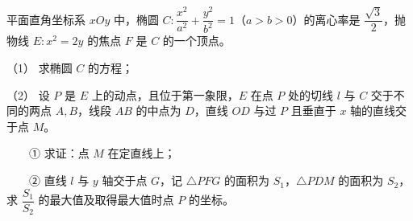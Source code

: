 \begin{question}
平面直角坐标系 \(xOy\) 中，椭圆 \(C:\dfrac{x^{2}}{a^{2}}+\dfrac{y^{2}}{b^{2}}=1\)（\(a>b>0\)）的离心率是 \(\dfrac{\sqrt{3}}{2}\)，抛物线 \(E:x^{2}=2y\) 的焦点 \(F\) 是 \(C\) 的一个顶点。

（1） 求椭圆 \(C\) 的方程；

（2） 设 \(P\) 是 \(E\) 上的动点，且位于第一象限，\(E\) 在点 \(P\) 处的切线 \(l\) 与 \(C\) 交于不同的两点 \(A,B\)，线段 \(AB\) 的中点为 \(D\)，直线 \(OD\) 与过 \(P\) 且垂直于 \(x\) 轴的直线交于点 \(M\)。

　　① 求证：点 \(M\) 在定直线上；

　　② 直线 \(l\) 与 \(y\) 轴交于点 \(G\)，记 \(\triangle PFG\) 的面积为 \(S_{1}\)，\(\triangle PDM\) 的面积为 \(S_{2}\)，求 \(\dfrac{S_{1}}{S_{2}}\) 的最大值及取得最大值时点 \(P\) 的坐标。
\nopagebreak[4]
\begin{center}\end{center}
\nopagebreak[4]

\end{question}